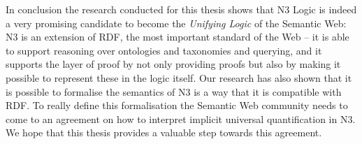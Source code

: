 In conclusion the research conducted for this thesis shows that N3 Logic is indeed a very promising candidate to become the \emph{Unifying Logic} of the Semantic Web:
N3 is an extension of RDF, the most important standard of the Web -- it is able to support reasoning over ontologies and taxonomies and querying, and it supports the layer
of proof by not only providing proofs but also by making it possible to represent these in the logic itself. Our research has also shown that it is possible 
to formalise the semantics of N3 is a way that it is compatible with RDF. To really define this formalisation the Semantic Web community needs to 
come to an agreement on how to interpret implicit universal quantification in N3. We hope that this thesis provides a valuable step towards this agreement.
